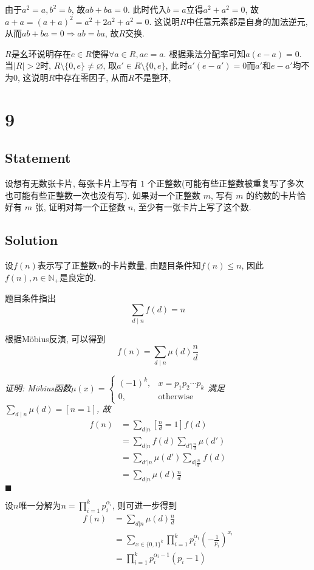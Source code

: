 \documentclass[UTF-8]{ctexart}
\begin{document}
由于$a^2 = a, b^2 = b$, 故$ab + ba = 0$. 此时代入$b = a$立得$a^2 + a^2 = 0$, 故$a + a = (a + a)^2 = a^2 + 2a^2 + a^2 = 0$. 这说明$R$中任意元素都是自身的加法逆元, 从而$ab + ba = 0 \Rightarrow ab = ba$, 故$R$交换.

$R$是幺环说明存在$e \in R$使得$\forall a \in R, ae = a$. 根据乘法分配率可知$a(e - a) = 0$. 当$|R| > 2$时, $R \setminus \{0 ,e\} \neq \varnothing$, 取$a' \in R \setminus \{0 ,e\}$, 此时$a' (e - a') = 0$而$a'$和$e - a'$均不为$0$, 这说明$R$中存在零因子, 从而$R$不是整环,
\section*{9}
\subsection*{Statement}
设想有无数张卡片, 每张卡片上写有 $1$ 个正整数(可能有些正整数被重复写了多次也可能有些正整数一次也没有写). 如果对一个正整数 $m$, 写有 $m$ 的约数的卡片恰好有 $m$ 张, 证明对每一个正整数 $n$, 至少有一张卡片上写了这个数.
\subsection*{Solution}
设$f(n)$表示写了正整数$n$的卡片数量, 由题目条件知$f(n) \le n$, 因此$f(n), n \in \mathbb N_+$是良定的.

题目条件指出$$\sum_{d \mid n}f(d) = n$$

根据M\"obius反演, 可以得到$$f(n) = \sum_{d \mid n}\mu(d)\frac nd$$

\textit{
证明: M\"obius函数$\mu(x) = \begin{cases}
(-1)^k, & x = p_1p_2\cdots p_k\\
0, & \text{otherwise}
\end{cases}$满足$\sum_{d \mid n}\mu(d) = [n = 1]$, 故
\begin{align*}
f(n) &= \sum_{d | n}[\frac nd = 1]f(d)\\
&= \sum_{d | n}f(d)\sum_{d' | \frac nd}\mu(d')\\
&= \sum_{d' | n}\mu(d')\sum_{d | \frac {n}{d'}}f(d)\\
&= \sum_{d | n}\mu(d)\frac nd
\end{align*}
\hfill $\blacksquare$
}

设$n$唯一分解为$n = \prod\limits_{i = 1}^{k}p_i^{\alpha_i}$, 则可进一步得到
\begin{align*}
f(n) &= \sum_{d | n}\mu(d)\frac nd\\
&= \sum_{x \in \{0, 1\}^k}\prod_{i = 1}^{k}p_i^{\alpha_i}(-\frac 1{p_i})^{x_i}\\
&= \prod_{i=1}^{k}p_i^{\alpha_i - 1}(p_i - 1)
\end{align*}
\end{document}
